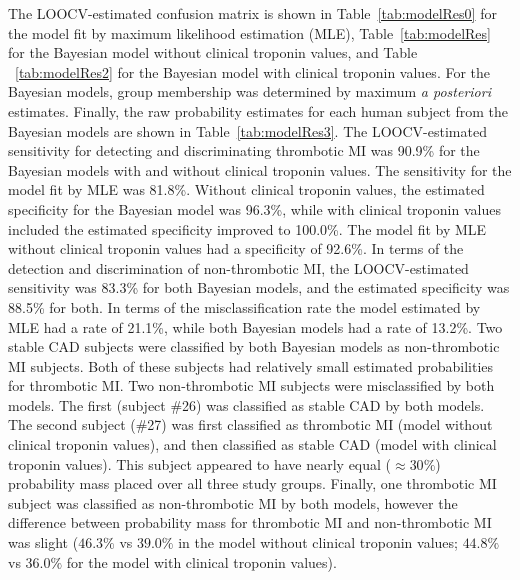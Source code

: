 \begin{DoubleSpace*}
The LOOCV-estimated confusion matrix is shown in Table~\ref{tab:modelRes0} for the model fit by maximum likelihood estimation (MLE), Table~\ref{tab:modelRes} for the Bayesian model without clinical troponin values, and Table ~\ref{tab:modelRes2} for the Bayesian model with clinical troponin values. For the Bayesian models, group membership was determined by maximum \emph{a posteriori} estimates. Finally, the raw probability estimates for each human subject from the Bayesian models are shown in Table~\ref{tab:modelRes3}. The LOOCV-estimated sensitivity for detecting and discriminating thrombotic MI was 90.9\% for the Bayesian models with and without clinical troponin values. The sensitivity for the model fit by MLE was 81.8\%. Without clinical troponin values, the estimated specificity for the Bayesian model was 96.3\%, while with clinical troponin values included the estimated specificity improved to 100.0\%. The model fit by MLE without clinical troponin values had a specificity of 92.6\%. In terms of the detection and discrimination of non-thrombotic MI, the LOOCV-estimated sensitivity was 83.3\% for both Bayesian models, and the estimated specificity was 88.5\% for both. In terms of the misclassification rate the model estimated by MLE had a rate of 21.1\%, while both Bayesian models had a  rate of 13.2\%. Two stable CAD subjects were classified by both Bayesian models as non-thrombotic MI subjects. Both of these subjects had relatively small estimated probabilities for thrombotic MI. Two non-thrombotic MI subjects were misclassified by both models. The first (subject \#26) was classified as stable CAD by both models. The second subject (\#27) was first classified as thrombotic MI (model without clinical troponin values), and then classified as stable CAD (model with clinical troponin values). This subject appeared to have nearly equal ($\approx 30\%$) probability mass placed over all three study groups. Finally, one thrombotic MI subject was classified as non-thrombotic MI by both models, however the difference between probability mass for thrombotic MI and non-thrombotic MI was slight ($46.3\%$ vs $39.0\%$ in the model without clinical troponin values; $44.8\%$ vs $36.0\%$ for the model with clinical troponin values).


\end{DoubleSpace*}
